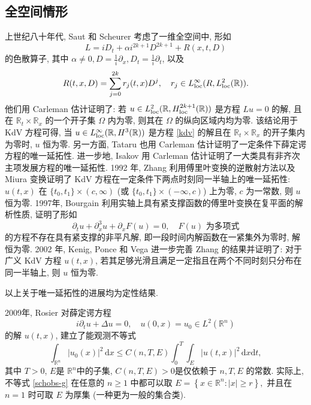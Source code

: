 \documentclass[master]{cugthesis}
\newcommand\R{\ensuremath{\mathbb{R}}}
\renewcommand\d{\ensuremath{\,\mathrm{d}}}
\begin{document}
\subsection{全空间情形}    
    上世纪八十年代, Saut 和 Scheurer \cite{saut1980theoreme,Saut1987UniqueCF} 考虑了一维全空间中, 形如
    \begin{equation*}
        L=iD_t +\alpha i^{2k+1}D^{2k+1}+R(x,t,D)
    \end{equation*}
    的色散算子, 其中 $\alpha\neq 0, D=\frac{1}{i}\partial_x, D_t =\frac{1}{i}\partial_t$, 以及
    \begin{equation*}
        R(t,x,D)=\sum_{j=0}^{2k}r_j(t,x)D^j,\quad r_j\in L_{\rm{loc}}^\infty(R,L^2_{\rm{loc}}(\R)).
    \end{equation*}
    他们用 Carleman 估计证明了: 若 $u\in L^2_{\rm{loc}}(\R,H_{\rm{loc}}^{2k+1}(\R))$ 是方程 $Lu=0$ 的解, 且在 $\R_t\times\R_x $ 的一个开子集 $\Omega$ 内为零, 则其在 $\Omega$ 的纵向区域内均为零. 该结论用于 KdV 方程可得, 当 $u\in L_{\rm{loc}}^\infty (\R, H^3(\R))$ 是方程 \eqref{kdv} 的解且在 $\R_t\times \R_x$ 的开子集内为零时, $u$ 恒为零. 另一方面, Tataru \cite{tataru1995carleman} 也用 Carleman 估计证明了一定条件下薛定谔方程的唯一延拓性. 进一步地, Isakov \cite{isakov1993carleman} 用 Carleman 估计证明了一大类具有非齐次主项发展方程的唯一延拓性. 
    1992 年, Zhang \cite{Zhang1992UniqueCF} 利用傅里叶变换的逆散射方法以及 Miura 变换证明了 KdV 方程在一定条件下两点时刻同一半轴上的唯一延拓性: $u(t,x)$ 在 $\lbrace t_0,t_1\rbrace\times (c,\infty)$ (或 $\lbrace t_0,t_1\rbrace \times (-\infty,c)$) 上为零, $c$ 为一常数, 则 $u$ 恒为零. 1997年, Bourgain \cite{bourgain1997compactness} 利用实轴上具有紧支撑函数的傅里叶变换在复平面的解析性质, 证明了形如 
    \begin{equation*}
        \partial_t u+ \partial_x^3u+\partial_x F(u) = 0, \quad F(u) \text{ 为多项式}
    \end{equation*}
  的方程不存在具有紧支撑的非平凡解, 即一段时间内解函数在一紧集外为零时, 解恒为零. 2002 年, Kenig, Ponce 和 Vega \cite{kenig2002support} 进一步完善 Zhang \cite{Zhang1992UniqueCF} 的结果并证明了: 对于广义 KdV 方程 $u(t,x)$, 若其足够光滑且满足一定指且在两个不同时刻只分布在同一半轴上, 则 $u$ 恒为零.
  
  以上关于唯一延拓性的进展均为定性结果.   
    
    2009年, Rosier \cite{Rosier2009ExactBC} 对薛定谔方程
    \begin{equation}
        i\partial_t u +\Delta u =0,\quad u(0,x)=u_0\in L^2(\R^n)\label{sch}
    \end{equation}
    的解 $u(t,x)$, 建立了能观测不等式
    \begin{equation}
        \int_{\R^n}|u_0(x)|^2\d x\le C(n,T,E)\int_0^T\int_E|u(t,x)|^2\d x\mathrm{d}t,\label{schobs-g}
    \end{equation}
    其中 $T>0$, $E$是 $\R^n$中的子集, $C(n,T,E)>0$是仅依赖于 $n,T,E$ 的常数. 实际上, 不等式 \eqref{schobs-g} 在任意的 $n\ge 1$ 中都可以取 $E=\left\lbrace x\in \R^n: |x|\ge r\right\rbrace, $ 并且在 $n=1$ 时可取 $E$ 为厚集\cite{Huang2020ObservableSP} (一种更为一般的集合类). 
    
\end{document}
